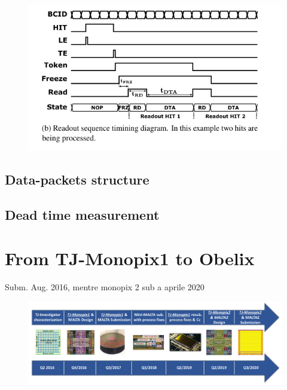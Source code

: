     \begin{figure}[h!]
        \centering
        \includegraphics[width=.7\linewidth]{figures/Monopix1/readout_timing.png}
        \caption{}
        \label{fig:readout_timing}
    \end{figure}
    

    \subsection{Data-packets structure}

    \subsection{Dead time measurement}

\section{From TJ-Monopix1 to Obelix}
    Subm. Aug. 2016, mentre monopix 2 sub a aprile 2020\\

    \begin{figure}[h!]
        \centering
        \includegraphics[width=.7\linewidth]{figures/Monopix1/TJ180nm.png}
        \caption{}
        \label{fig:TJ180nm}
    \end{figure}

